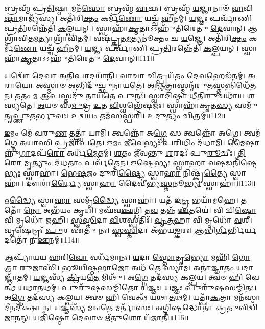 𑌬𑍍𑌰𑌹𑍍𑌮᳴ 𑌪𑍍𑌰\-\ul{𑌤𑌿}\-𑌷𑍍𑌠𑌾 𑌮𑌨᳴\-\ul{𑌸𑍋} 𑌬𑍍𑌰𑌹𑍍𑌮᳴ \ul{𑌵𑌾}\-𑌚𑌃।
𑌬𑍍𑌰𑌹𑍍𑌮᳴ \ul{𑌯}\-𑌜𑍍𑌞𑌾𑌨𑌾𑍞᳴ \ul{𑌹}\-𑌵𑌿\-\ul{𑌷𑌾}\-𑌮𑌾𑌜𑍍𑌯᳴𑌸𑍍𑌯।
𑌅𑌤𑌿᳴𑌰𑌿\-\ul{𑌕𑍍𑌤𑌂} 𑌕𑌰𑍍𑌮᳴\-\ul{𑌣𑍋} 𑌯𑌚𑍍𑌚᳴ \ul{𑌹𑍀}\-𑌨𑌮𑍍।
\-\ul{𑌯}\-𑌜𑍍𑌞𑌃 𑌪𑌰𑍍𑌵𑌾᳴𑌣𑌿 𑌪𑍍𑌰\-\ul{𑌤𑌿}\-𑌰𑌨𑍍𑌨𑍇᳴𑌤𑌿 \ul{𑌕}\-𑌲𑍍𑌪𑌯𑌨𑍍।
𑌸𑍍𑌵𑌾𑌹𑌾᳴\-\ul{𑌕𑍃}\-𑌤𑌾\-𑌽𑌽𑌹𑍁᳴𑌤𑌿𑌰𑍇𑌤𑍁 \ul{𑌦𑍇}\-𑌵𑌾𑌨𑍍।
𑌆𑌶𑍍𑌰𑌾᳴𑌵𑌿𑌤\-\ul{𑌮}\-𑌤𑍍𑌯𑌾𑌶𑍍𑌰𑌾᳴𑌵𑌿𑌤𑌮𑍍।
𑌵𑌷᳴𑌟𑍍𑌕𑍃𑌤\-\ul{𑌮}\-𑌤𑍍𑌯𑌨𑍂॑𑌕𑍍𑌤𑌂 𑌚 \ul{𑌯}\-𑌜𑍍𑌞𑍇।
𑌅𑌤𑌿᳴𑌰𑌿\-\ul{𑌕𑍍𑌤𑌂} 𑌕𑌰𑍍𑌮᳴\-\ul{𑌣𑍋} 𑌯𑌚𑍍𑌚᳴ \ul{𑌹𑍀}\-𑌨𑌮𑍍।
\-\ul{𑌯}\-𑌜𑍍𑌞𑌃 𑌪𑌰𑍍𑌵𑌾᳴𑌣𑌿 𑌪𑍍𑌰\-\ul{𑌤𑌿}\-𑌰𑌨𑍍𑌨𑍇᳴𑌤𑌿 \ul{𑌕}\-𑌲𑍍𑌪𑌯𑌨𑍍।
𑌸𑍍𑌵𑌾𑌹𑌾᳴\-\ul{𑌕𑍃}\-𑌤𑌾\-𑌽𑌽𑌹𑍁᳴𑌤𑌿𑌰𑍇𑌤𑍁 \ul{𑌦𑍇}\-𑌵𑌾𑌨𑍍॥111॥

𑌯𑌦𑍍𑌵𑍋᳴ 𑌦𑍇𑌵𑌾 𑌅𑌤𑌿\-\ul{𑌪𑌾}\-𑌦𑌯𑌾᳴𑌨𑌿।
\-\ul{𑌵𑌾}\-𑌚𑌾 \ul{𑌚𑌿}\-𑌤𑍍𑌪𑍍𑌰𑌯᳴𑌤𑌂 𑌦𑍇\-\ul{𑌵}\-𑌹𑍇𑌡᳴𑌨𑌮𑍍।
\-\ul{𑌅}\-\-\ul{𑌰𑌾}\-𑌯𑍋 \ul{𑌅}\-𑌸𑍍𑌮𑌾𑍞 \ul{𑌅}\-𑌭𑌿𑌦𑍁᳴𑌚𑍍𑌛𑍁\-\ul{𑌨𑌾}\-𑌯𑌤𑍇॑।
\-\ul{𑌅}\-𑌨𑍍𑌯\-\ul{𑌤𑍍𑌰𑌾}\-𑌸𑍍𑌮𑌨𑍍𑌮᳴𑌰𑍁\-\ul{𑌤}\-𑌸𑍍𑌤𑌨𑍍𑌨𑌿𑌧𑍇᳴\-𑌤𑌨।
\-\ul{𑌤}\-𑌤𑌂 \ul{𑌮} 𑌆\-\ul{𑌪}\-𑌸𑍍𑌤𑌦𑍁᳴ 𑌤𑌾𑌯\-\ul{𑌤𑍇} 𑌪𑍁𑌨𑌃᳴।
𑌸𑍍𑌵𑌾𑌦𑌿᳴𑌷𑍍𑌠𑌾 \ul{𑌧𑍀}\-𑌤𑌿\-\ul{𑌰𑍁}\-𑌚𑌥𑌾᳴𑌯 𑌶𑌸𑍍𑌯𑌤𑍇।
\-\ul{𑌅}\-𑌯𑍞 𑌸᳴\-\ul{𑌮𑍁}\-𑌦𑍍𑌰 \ul{𑌉}\-𑌤 \ul{𑌵𑌿}\-𑌶𑍍𑌵𑌭𑍇᳴𑌷𑌜𑌃।
𑌸𑍍𑌵𑌾𑌹𑌾᳴𑌕𑍃𑌤\-\ul{𑌸𑍍𑌯} 𑌸𑌮𑍁᳴𑌤𑍃𑌪𑍍𑌣𑍁𑌤𑌰𑍍𑌭𑍁𑌵𑌃।
𑌉\-\ul{𑌦𑍍𑌵}\-𑌯𑌂 𑌤𑌮᳴\-\ul{𑌸}\-𑌸𑍍𑌪𑌰𑌿᳴।
𑌉\-\ul{𑌦𑍁}\-𑌤𑍍𑌯𑌂 \ul{𑌚𑌿}\-𑌤𑍍𑌰𑌮𑍍॥112॥

\-\ul{𑌇}\-𑌮𑌂 𑌮𑍇᳴ 𑌵𑌰𑍁\-\ul{𑌣} 𑌤𑌤𑍍𑌤𑍍𑌵𑌾᳴ 𑌯𑌾𑌮𑌿।
𑌤𑍍𑌵𑌨𑍍𑌨𑍋᳴ 𑌅\-\ul{𑌗𑍍𑌨𑍇} 𑌸 𑌤𑍍𑌵𑌨𑍍𑌨𑍋᳴ 𑌅𑌗𑍍𑌨𑍇।
𑌤𑍍𑌵𑌮᳴𑌗𑍍𑌨𑍇 \ul{𑌅}\-𑌯𑌾\-\ul{𑌸𑌿} 𑌪𑍍𑌰𑌜𑌾᳴𑌪𑌤𑍇।
\-\ul{𑌇}\-𑌮𑌂 \ul{𑌜𑍀}\-𑌵𑍇𑌭𑍍𑌯𑌃᳴ 𑌪\-\ul{𑌰𑌿}\-𑌧𑌿𑌂 𑌦᳴𑌧𑌾𑌮𑌿।
𑌮𑍈𑌷𑌾𑌨𑍍𑌨𑍁᳴\-\ul{𑌗𑌾}\-𑌦𑌪᳴\-\ul{𑌰𑍋} 𑌅𑌰𑍍𑌧᳴\-\ul{𑌮𑍇}\-𑌤𑌮𑍍।
\-\ul{𑌶}\-𑌤𑌂 𑌜𑍀᳴𑌵𑌨𑍍𑌤𑍁 \ul{𑌶}\-𑌰𑌦𑌃᳴ 𑌪𑍁\-\ul{𑌰𑍂}\-𑌚𑍀𑌃।
\-\ul{𑌤𑌿}\-𑌰𑍋 \ul{𑌮𑍃}\-𑌤𑍍𑌯𑍁𑌂 𑌦᳴𑌧\-\ul{𑌤𑌾𑌂} 𑌪𑌰𑍍𑌵᳴𑌤𑍇𑌨।
\-\ul{𑌇}\-𑌷𑍍𑌟𑍇\-\ul{𑌭𑍍𑌯𑌃} 𑌸𑍍𑌵𑌾\-\ul{𑌹𑌾} 𑌵\-\ul{𑌷}\-𑌡𑌨𑌿᳴𑌷𑍍𑌟𑍇\-\ul{𑌭𑍍𑌯𑌃} 𑌸𑍍𑌵𑌾𑌹𑌾॑।
\-\ul{𑌭𑍇}\-\-\ul{𑌷}\-𑌜𑌂 𑌦𑍁𑌰𑌿᳴\-\ul{𑌷𑍍𑌟𑍍𑌯𑍈} 𑌸𑍍𑌵𑌾\-\ul{𑌹𑌾} 𑌨𑌿𑌷𑍍𑌕𑍃᳴\-\ul{𑌤𑍍𑌯𑍈} 𑌸𑍍𑌵𑌾𑌹𑌾॑।
𑌦𑍗𑌰𑌾॑\-\ul{𑌰𑍍𑌧𑍍𑌯𑍈} 𑌸𑍍𑌵𑌾\-\ul{𑌹𑌾} 𑌦𑍈𑌵𑍀॑𑌭𑍍𑌯\-\ul{𑌸𑍍𑌤}\-𑌨𑍂\-\ul{𑌭𑍍𑌯𑌃} 𑌸𑍍𑌵𑌾𑌹𑌾॑॥113॥

𑌋\-\ul{𑌦𑍍𑌧𑍍𑌯𑍈} 𑌸𑍍𑌵𑌾\-\ul{𑌹𑌾} 𑌸𑌮𑍃᳴\-\ul{𑌦𑍍𑌧𑍍𑌯𑍈} 𑌸𑍍𑌵𑌾𑌹𑌾॑।
𑌯𑌤᳴ 𑌇\-\ul{𑌨𑍍𑌦𑍍𑌰} 𑌭𑌯𑌾᳴𑌮𑌹𑍇।
𑌤𑌤𑍋᳴ \ul{𑌨𑍋} 𑌅𑌭᳴𑌯𑌂 𑌕𑍃𑌧𑌿।
𑌮𑌘᳴𑌵\-\ul{𑌞𑍍𑌛}\-𑌗𑍍𑌧𑌿 𑌤\-\ul{𑌵} 𑌤𑌨𑍍𑌨᳴ \ul{𑌊}\-𑌤𑌯𑍇॑।
𑌵𑌿 𑌦𑍍𑌵𑌿\-\ul{𑌷𑍋} 𑌵𑌿 𑌮𑍃𑌧𑍋᳴ 𑌜𑌹𑌿।
\-\ul{𑌸𑍍𑌵}\-\-\ul{𑌸𑍍𑌤𑌿}\-𑌦𑌾 \ul{𑌵𑌿}\-𑌶𑌸𑍍𑌪𑌤𑌿𑌃᳴।
\-\ul{𑌵𑍃}\-\-\ul{𑌤𑍍𑌰}\-𑌹𑌾 𑌵𑌿 𑌮𑍃𑌧𑍋᳴ \ul{𑌵}\-𑌶𑍀।
𑌵𑍃𑌷𑍇𑌨𑍍𑌦𑍍𑌰𑌃᳴ \ul{𑌪𑍁}\-𑌰 𑌏᳴𑌤𑍁 𑌨𑌃।
\-\ul{𑌸𑍍𑌵}\-\-\ul{𑌸𑍍𑌤𑌿}\-𑌦𑌾 𑌅᳴𑌭𑌯\-\ul{𑌙𑍍𑌕}\-𑌰𑌃।
\-\ul{𑌆}\-𑌭𑌿\-\ul{𑌰𑍍𑌗𑍀}\-𑌰𑍍𑌭𑌿𑌰𑍍𑌯𑌦𑌤𑍋᳴ 𑌨 \ul{𑌊}\-𑌨𑌮𑍍॥114॥

𑌆𑌪𑍍𑌯𑌾᳴𑌯𑌯 𑌹𑌰𑌿\-\ul{𑌵𑍋} 𑌵𑌰𑍍𑌧᳴𑌮𑌾𑌨𑌃।
\-\ul{𑌯}\-𑌦𑌾 \ul{𑌸𑍍𑌤𑍋}\-𑌤𑍃\-\ul{𑌭𑍍𑌯𑍋} 𑌮𑌹𑌿᳴ \ul{𑌗𑍋}\-𑌤𑍍𑌰𑌾 \ul{𑌰𑍁}\-𑌜𑌾𑌸𑌿᳴।
\-\ul{𑌭𑍂}\-\-\ul{𑌯𑌿}\-\-\ul{𑌷𑍍𑌠}\-𑌭𑌾\-\ul{𑌜𑍋} 𑌅𑌧᳴ 𑌤𑍇 𑌸𑍍𑌯𑌾𑌮।
𑌅𑌨𑌾॑𑌜𑍍𑌞𑌾\-\ul{𑌤𑌂} 𑌯𑌦𑌾𑌜𑍍𑌞𑌾᳴𑌤𑌮𑍍।
\-\ul{𑌯}\-𑌜𑍍𑌞𑌸𑍍𑌯᳴ \ul{𑌕𑍍𑌰𑌿}\-𑌯\-\ul{𑌤𑍇} 𑌮𑌿𑌥𑍁᳴।
𑌅\-\ul{𑌗𑍍𑌨𑍇} 𑌤𑌦᳴𑌸𑍍𑌯 𑌕𑌲𑍍𑌪𑌯।
𑌤𑍍𑌵𑍞 𑌹𑌿 𑌵𑍇𑌤𑍍𑌥᳴ 𑌯𑌥𑌾\-\ul{𑌤}\-𑌥𑌮𑍍।
𑌪𑍁𑌰𑍁᳴𑌷𑌸𑌮𑍍𑌮𑌿𑌤𑍋 \ul{𑌯}\-𑌜𑍍𑌞𑌃।
\-\ul{𑌯}\-𑌜𑍍𑌞𑌃 𑌪𑍁𑌰𑍁᳴𑌷𑌸𑌮𑍍𑌮𑌿𑌤𑌃।
𑌅\-\ul{𑌗𑍍𑌨𑍇} 𑌤𑌦᳴𑌸𑍍𑌯 𑌕𑌲𑍍𑌪𑌯।
𑌤𑍍𑌵𑍞 𑌹𑌿 𑌵𑍇𑌤𑍍𑌥᳴ 𑌯𑌥𑌾\-\ul{𑌤}\-𑌥𑌮𑍍।
𑌯𑌤𑍍𑌪𑌾᳴\-\ul{𑌕}\-𑌤𑍍𑌰𑌾 𑌮𑌨᳴𑌸𑌾 \ul{𑌦𑍀}\-𑌨𑌦᳴\-\ul{𑌕𑍍𑌷𑌾} 𑌨।
\-\ul{𑌯}\-𑌜𑍍𑌞𑌸𑍍𑌯᳴ \ul{𑌮}\-𑌨𑍍𑌵\-\ul{𑌤𑍇} 𑌮𑌰𑍍𑌤𑌾᳴𑌸𑌃।
\-\ul{𑌅}\-𑌗𑍍𑌨𑌿𑌷𑍍𑌟𑌦𑍍𑌧𑍋𑌤𑌾॑ 𑌕𑍍𑌰\-\ul{𑌤𑍁}\-𑌵𑌿𑌦𑍍𑌵𑌿᳴\-\ul{𑌜𑌾}\-𑌨𑌨𑍍।
𑌯𑌜𑌿᳴𑌷𑍍𑌠𑍋 \ul{𑌦𑍇}\-𑌵𑌾𑍞 𑌋᳴\-\ul{𑌤𑍁}\-𑌶𑍋 𑌯᳴𑌜𑌾𑌤𑌿॥115॥\anuvakamend[\-\ul{𑌦𑍇}\-𑌵𑌾𑍟\-\ul{𑌶𑍍𑌚𑌿}\-𑌤𑍍𑌰𑌂 \ul{𑌤}\-𑌨𑍂\-\ul{𑌭𑍍𑌯𑌃} 𑌸𑍍𑌵𑌾\-\ul{𑌹𑍋}\-𑌨𑌂 𑌪𑍁𑌰𑍁᳴𑌷𑌸\-\ul{𑌮𑍍𑌮𑌿}\-𑌤𑍋\-𑌽\-\ul{𑌗𑍍𑌨𑍇} 𑌤𑌦᳴𑌸𑍍𑌯 𑌕𑌲𑍍𑌪\-\ul{𑌯} 𑌪𑌞𑍍𑌚᳴ 𑌚]

